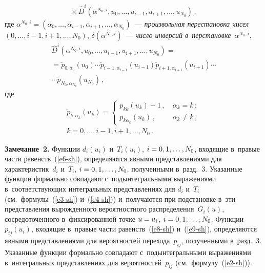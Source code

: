 \begin{multicols}{2}
\begin{multline}
  {}\times \hat{D}^i 
\left( \alpha^{N_0,i}, u_0, \ldots , u_{i-1}, u_{i+1},\ldots , u_{N_0}\right)\,,
  \label{e8-sh}
  \end{multline}
  где $\alpha^{N_0,i} = (\alpha_0,\ldots , \alpha_{i-1}, \alpha_{i+1}, \ldots , 
\alpha_{N_0})$~--- \textit{произвольная пе\-ре\-ста\-нов\-ка чисел} $(0,\ldots , i-1, i+1, 
\ldots, N_0)$,
  $\delta(\alpha^{N_0,i})$~--- \textit{чис\-ло инверсий 
  в~перстановке}~$\alpha^{N_0,i}$,
  \begin{multline}
  \hat{D}^i\left( \alpha^{N_0,i}, u_0, \ldots , u_{i-1}, u_{i+1}, \ldots , 
u_{N_0}\right)={}\\
  {}=\tilde{p}_{0,\alpha_0}\left(u_0\right)\cdots \tilde{p}_{i-1,\alpha_{i-1}} \left( 
u_{i-1}\right) \tilde{p}_{i+1, \alpha_{i+1}}\left( u_{i+1}\right)\cdots \\
\cdots
\tilde{p}_{N_0,\alpha_{N_0}}\left( u_{N_0}\right)\,,
  \label{e9-sh}
  \end{multline}
где  
  \begin{multline*}
  \tilde{p}_{k,\alpha_k}(u_k) = \begin{cases}
  p_{kk}(u_k)-1\,, &\ \alpha_k=k\,;\\
  p_{k\alpha_k}(u_k)\,, &\ \alpha_k\not=k\,,
  \end{cases}\\
  k=0,\ldots, i-1, i+1, \ldots , N_0\,.
  \end{multline*}
  
  \noindent
  \textbf{Замечание~2.} Функции $d_i(u_i)$ и~$T_i(u_i)$, $i\hm=0,1,\ldots , N_0$,  
входящие в~правые час\-ти равенств~(\ref{e6-sh}), определяются 
явными пред\-став\-ле\-ни\-ями для характеристик~$d_i$ и~$T_i$, $i\hm=0,1,\ldots , 
N_0$, полученными в~разд.~3. Указанные функ\-ции 
формально совпадают с~подынтегральными выражениями 
в~со\-от\-вет\-ст\-ву\-ющих интегральных пред\-став\-ле\-ни\-ях для $d_i$ и~$T_i$ 
(см.\ формулы~(\ref{e3-sh}) и~(\ref{e4-sh})) и~получаются при под\-ста\-нов\-ке в~эти 
пред\-став\-ле\-ния вы\-рож\-ден\-но\-го вероятностного распределения~$G_i(u)$, 
сосредоточенного в~фиксированной точке $u\hm=u_i$, $i\hm=0,1,\ldots ,N_0$.  
Функции~$p_{ij}(u_i)$, входящие в~правые час\-ти равенств~(\ref{e8-sh}) 
и~(\ref{e9-sh}), определяются явными пред\-став\-ле\-ни\-ями для вероятностей 
перехода~$p_{ij}$, полученными в~разд.~3. Указанные функ\-ции формально 
совпадают с~подынтегральными выражениями в~интегральных 
пред\-став\-ле\-ни\-ях для вероятностей~$p_{ij}$ (см.\ формулу~(\ref{e2-sh})). 
  
  \smallskip
  

\end{multicols}
